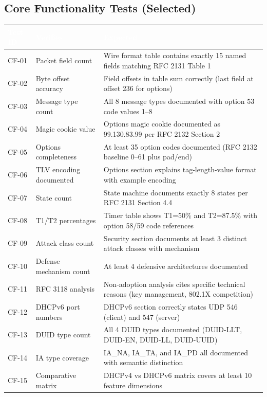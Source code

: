 \documentclass[11pt,letterpaper]{article}
\newcommand{\tableheader}[1]{\textbf{\sffamily\textcolor{white}{#1}}}
\begin{document}
\subsection{Core Functionality Tests (Selected)}

\begin{center}
\begin{tabularx}{\textwidth}{C{1.2cm}L{3.5cm}X}
\toprule
{}
\tableheader{Test ID} & \tableheader{Verifies} & \tableheader{Expected} \\
\midrule
CF-01 & Packet field count & Wire format table contains exactly 15 named fields matching RFC 2131 Table 1 \\
CF-02 & Byte offset accuracy & Field offsets in table sum correctly (last field at offset 236 for options) \\
CF-03 & Message type count & All 8 message types documented with option 53 code values 1--8 \\
CF-04 & Magic cookie value & Options magic cookie documented as 99.130.83.99 per RFC 2132 Section 2 \\
CF-05 & Options completeness & At least 35 option codes documented (RFC 2132 baseline 0--61 plus pad/end) \\
CF-06 & TLV encoding documented & Options section explains tag-length-value format with example encoding \\
CF-07 & State count & State machine documents exactly 8 states per RFC 2131 Section 4.4 \\
CF-08 & T1/T2 percentages & Timer table shows T1=50\% and T2=87.5\% with option 58/59 code references \\
CF-09 & Attack class count & Security section documents at least 3 distinct attack classes with mechanism \\
CF-10 & Defense mechanism count & At least 4 defensive architectures documented \\
CF-11 & RFC 3118 analysis & Non-adoption analysis cites specific technical reasons (key management, 802.1X competition) \\
CF-12 & DHCPv6 port numbers & DHCPv6 section correctly states UDP 546 (client) and 547 (server) \\
CF-13 & DUID type count & All 4 DUID types documented (DUID-LLT, DUID-EN, DUID-LL, DUID-UUID) \\
CF-14 & IA type coverage & IA\_NA, IA\_TA, and IA\_PD all documented with semantic distinction \\
CF-15 & Comparative matrix & DHCPv4 vs DHCPv6 matrix covers at least 10 feature dimensions \\
\bottomrule
\end{tabularx}
\end{center}
\end{document}
